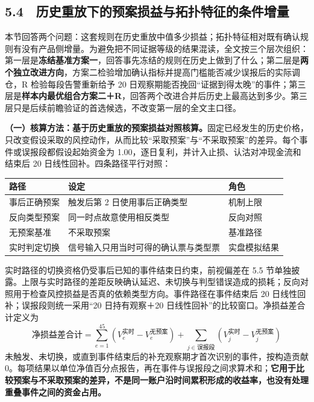 \documentclass[12pt,a4paper]{ctexart}
\begin{document}
\subsection{5.4　历史重放下的预案损益与拓扑特征的条件增量}
本节回答两个问题：这套规则在历史重放中值多少损益；拓扑特征相对既有确认规则有没有产品侧增量。为避免把不同证据等级的结果混读，全文按三个层次组织：第一层是\textbf{冻结基准方案一}，回答事先冻结的规则在历史上做到了什么；第二层是\textbf{两个独立改进方向}，方案二检验增加确认指标并提高门槛能否减少误报后的实际调仓，R 检验每段告警重新给予 20 日观察期能否挽回“证据到得太晚”的事件；第三层是\textbf{样本内最优组合方案二＋R}，回答两个改进合并后历史上最高达到多少。第三层只是后续前瞻验证的首选候选，不改变第一层的全文主口径。\par
\textbf{（一）核算方法：基于历史重放的预案损益对照核算。}固定已经发生的历史价格，只改变假设采取的风控动作，从而比较“采取预案”与“不采取预案”的差异。每个事件或误报段都假设起始资金为 1.00，逐日复利，并计入止损、认沽对冲现金流和结束后 20 日线性回补。四条路径平行对照：\par
\begin{center}\small
\begin{tabularx}{\textwidth}{>{\raggedright\arraybackslash}X>{\raggedright\arraybackslash}X>{\raggedright\arraybackslash}X}
\toprule
\textbf{路径} & \textbf{设定} & \textbf{角色} \\
\midrule
事后正确预案 & 触发后第 2 日使用事后正确类型 & 机制上限 \\
反向类型预案 & 同一时点故意使用相反类型 & 反向对照 \\
无预案基准 & 不采取预案 & 基准路径 \\
实时判定切换 & 信号输入只用当时可得的确认票与类型票 & 实盘模拟结果 \\
\bottomrule
\end{tabularx}
\end{center}
实时路径的切换资格仍受事后已知的事件结束日约束，前视偏差在 5.5 节单独披露。上限与实时路径的差距反映确认延迟、未切换与判型错误造成的损耗；反向对照用于检查风控损益是否真的依赖类型方向。事件路径在事件结束后 20 日线性回补；误报段则统一采用“20 日持有观察＋20 日线性回补”的比较窗口。净损益差合计定义为
\[
\text{净损益差合计}=\sum_{e=1}^{45}\left(V_e^{\text{实时}}-V_e^{\text{无预案}}\right)
+\sum_{j\in\text{误报段}}\left(V_j^{\text{实时}}-V_j^{\text{无预案}}\right)
\]
未触发、未切换，或直到事件结束后的补充观察期才首次识别的事件，按构造贡献 0。每项结果以单位净值百分点报告，再在事件与误报段之间求算术和；\textbf{它用于比较预案与不采取预案的差异，不是同一账户沿时间累积形成的收益率，也没有处理重叠事件之间的资金占用。}\par
\end{document}

